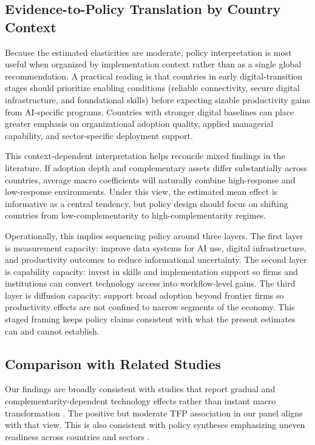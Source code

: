 \subsection{Evidence-to-Policy Translation by Country Context}

Because the estimated elasticities are moderate, policy interpretation is most useful when organized by implementation context rather than as a single global recommendation. A practical reading is that countries in early digital-transition stages should prioritize enabling conditions (reliable connectivity, secure digital infrastructure, and foundational skills) before expecting sizable productivity gains from AI-specific programs. Countries with stronger digital baselines can place greater emphasis on organizational adoption quality, applied managerial capability, and sector-specific deployment support.

This context-dependent interpretation helps reconcile mixed findings in the literature. If adoption depth and complementary assets differ substantially across countries, average macro coefficients will naturally combine high-response and low-response environments. Under this view, the estimated mean effect is informative as a central tendency, but policy design should focus on shifting countries from low-complementarity to high-complementarity regimes.

Operationally, this implies sequencing policy around three layers. The first layer is measurement capacity: improve data systems for AI use, digital infrastructure, and productivity outcomes to reduce informational uncertainty. The second layer is capability capacity: invest in skills and implementation support so firms and institutions can convert technology access into workflow-level gains. The third layer is diffusion capacity: support broad adoption beyond frontier firms so productivity effects are not confined to narrow segments of the economy. This staged framing keeps policy claims consistent with what the present estimates can and cannot establish.

\subsection{Comparison with Related Studies}

Our findings are broadly consistent with studies that report gradual and complementarity-dependent technology effects rather than instant macro transformation \cite{brynjolfssonHitt2000,brynjolfssonRockSyverson2019}. The positive but moderate TFP association in our panel aligns with that view. This is also consistent with policy syntheses emphasizing uneven readiness across countries and sectors \cite{oecd2023ai,imf2024}.

